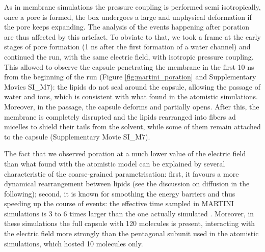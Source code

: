 As in membrane simulations the pressure coupling is performed semi isotropically, once a pore is formed, the box undergoes a large and unphysical deformation if the pore keeps expanding. The analysis of the events happening after poration are thus affected by this artefact.
%
To obviate to that, we took a frame at the early stages of pore formation (1 ns after the first formation of a water channel) and continued the run, with the same electric field, with isotropic pressure coupling. This allowed to observe the capsule penetrating the membrane in the first 10 ns from the beginning of the run (Figure \ref{fig:martini_poration} and Supplementary Movies SI\_M7): the lipids do not seal around the capsule, allowing the passage of water and ions, which is consistent with what found in the atomistic simulations. Moreover, in the passage, the capsule deforms and partially opens.
%
After this, the membrane is completely disrupted and the lipids rearranged into fibers ad micelles to shield their tails from the solvent, while some of them remain attached to the capsule (Supplementary Movie SI\_M7).

The fact that we observed poration at a much lower value of the electric field than what found with the atomistic model can be explained by several characteristic of the coarse-grained parametrisation: first, it favours a more dynamical rearrangement between lipids (see the discussion on diffusion in the following); second, it is known for smoothing the energy barriers and thus speeding up the course of events: the effective time sampled in MARTINI simulations is 3 to 6 times larger than the one actually simulated \citep{SiewertJ.Marrink2003}. Moreover, in these simulations the full capsule with 120 molecules is present, interacting with the electric field more strongly than the pentagonal subunit used in the atomistic simulations, which hosted 10 molecules only.

